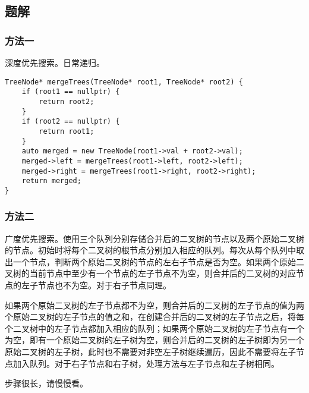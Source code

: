 \documentclass[lang=cn,10pt]{elegantbook}
\begin{document}
\subsection*{题解}

\subsubsection*{方法一}

深度优先搜索。日常递归。

\begin{lstlisting}
TreeNode* mergeTrees(TreeNode* root1, TreeNode* root2) {
	if (root1 == nullptr) {
		return root2;
	}
	if (root2 == nullptr) {
		return root1;
	}
	auto merged = new TreeNode(root1->val + root2->val);
	merged->left = mergeTrees(root1->left, root2->left);
	merged->right = mergeTrees(root1->right, root2->right);
	return merged;
}
\end{lstlisting}

\subsubsection*{方法二}

广度优先搜索。使用三个队列分别存储合并后的二叉树的节点以及两个原始二叉树的节点。初始时将每个二叉树的根节点分别加入相应的队列。每次从每个队列中取出一个节点，判断两个原始二叉树的节点的左右子节点是否为空。如果两个原始二叉树的当前节点中至少有一个节点的左子节点不为空，则合并后的二叉树的对应节点的左子节点也不为空。对于右子节点同理。

如果两个原始二叉树的左子节点都不为空，则合并后的二叉树的左子节点的值为两个原始二叉树的左子节点的值之和，在创建合并后的二叉树的左子节点之后，将每个二叉树中的左子节点都加入相应的队列；如果两个原始二叉树的左子节点有一个为空，即有一个原始二叉树的左子树为空，则合并后的二叉树的左子树即为另一个原始二叉树的左子树，此时也不需要对非空左子树继续遍历，因此不需要将左子节点加入队列。对于右子节点和右子树，处理方法与左子节点和左子树相同。

步骤很长，请慢慢看。
\end{document}
